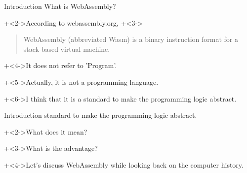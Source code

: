 %
%

\begin{frame}{Introduction}{}
    What is WebAssembly?
    \vspace{2ex}

    \onslide+<2->{According to webassembly.org,}
    \onslide+<3->{\begin{quote}WebAssembly (abbreviated Wasm) is a binary instruction format for a stack-based virtual machine.\end{quote}}

    \onslide+<4->{It does not refer to 'Program'.}

    \onslide+<5->{Actually, it is not a programming language.}
    \vspace{2ex}

    \onslide+<6->{I think that it is a standard to make the programming logic abstract.}
\end{frame}


\begin{frame}{Introduction}{}
    standard to make the programming logic abstract.
    \vspace{4ex}

    \onslide+<2->{What does it mean?}

    \onslide+<3->{What is the advantage?}
    \vspace{4ex}

    \onslide+<4->{Let's discuss WebAssembly
    while looking back on the computer history.}
\end{frame}
